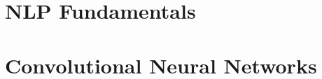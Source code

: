 \documentclass[11pt, a4paper]{article}
\begin{document}
\begin{spacing}{1.1}
	\section{NLP Fundamentals}
	
	
	
	
	
	
	
	
	
	
	
	
	
	
	
	
	\newpage

	\section{Convolutional Neural Networks}
	
	
	
	
	
	
	
	
	
	
	
	
	
	
\end{spacing}
\end{document}
